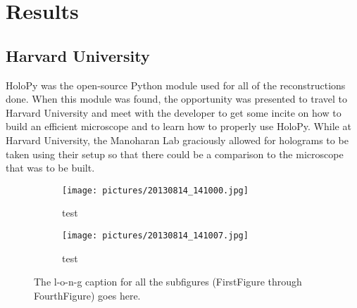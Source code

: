 
\usepackage{subcaption}
\usepackage{lmodern}


\chapter{Results} \label{chap:Results}

\section{Harvard University}

HoloPy was the open-source Python module used for all of the reconstructions
done. When this module was found, the opportunity was presented to travel to
Harvard University and meet with the developer to get some incite on how to
build an efficient microscope and to learn how to properly use HoloPy. While at
Harvard University, the Manoharan Lab graciously allowed for holograms to be
taken using their setup so that there could be a comparison to the microscope
that was to be built.

\begin{figure}[ht!]
    \begin{center}

        \begin{subfigure}[t]{0.4\textwidth}
            \label{fig:second}
            \texttt{[image: pictures/20130814\_141000.jpg]}
            \caption{test}
        \end{subfigure}
                \hspace*{\fill}
        \begin{subfigure}[t]{0.4\textwidth}
            \label{fig:third}
            \texttt{[image: pictures/20130814\_141007.jpg]}
            \caption{test}
        \end{subfigure}

    \end{center}
    \caption{%
        The l-o-n-g caption for all the subfigures
        (FirstFigure through FourthFigure) goes here.
    }%
    \label{fig:subfigures}
\end{figure}

